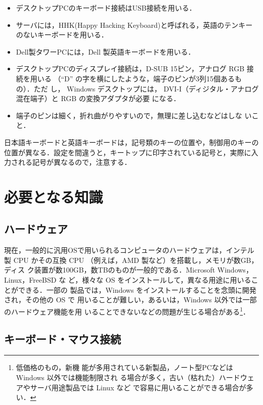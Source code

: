 \begin{itemize}
 \item デスクトップPCのキーボード接続はUSB接続を用いる．
 \item サーバには，HHK(Happy Hacking Keyboard)と呼ばれる，英語のテンキー
       のないキーボードを用いる．
 \item Dell製タワーPCには，Dell 製英語キーボードを用いる．
 \item デスクトップPCのディスプレイ接続は，D-SUB 15ピン，アナログ RGB 接続を用いる
       （``D'' の字を横にしたような，端子のピンが3列15個あるもの）．ただ
       し，%
       Windows デスクトップには，
       DVI-I（ディジタル・アナログ混在端子）と RGB の変換アダプタが必要
       になる．
 \item 端子のピンは細く，折れ曲がりやすいので，無理に差し込むなどはしな
       いこと．
\end{itemize}

日本語キーボードと英語キーボードは，記号類のキーの位置や，制御用のキーの
位置が異なる．設定を間違うと，キートップに印字されている記号と，実際に入
力される記号が異なるので，注意する．

\section{必要となる知識}

\subsection{ハードウェア}

現在，一般的に汎用OSで用いられるコンピュータのハードウェアは，インテル製
CPU かその互換 CPU （例えば，AMD 製など）を搭載し，メモリが数GB，ディス
ク装置が数100GB，数TBのものが一般的である．Microsoft Windows，Linux，FreeBSD な
ど，様々な OS をインストールして，異なる用途に用いることができる．一部の
製品では，Windows をインストールすることを念頭に開発され，その他の OS で
用いることが難しい，あるいは，Windows 以外では一部のハードウェア機能を用
いることできないなどの問題が生じる場合がある\footnote{低価格のもの，新機
能が多用されている新製品，ノート型PCなどは Windows 以外では機能制限され
る場合が多く，古い（枯れた）ハードウェアやサーバ用途製品では Linux など
で容易に用いることができる場合が多い．}．

\subsection{キーボード・マウス接続}

